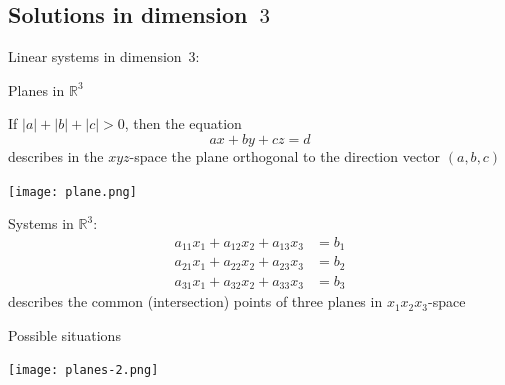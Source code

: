 \documentclass%
[handout]%
{beamer}
\newcommand{\bR}{{\mathbb R}}
\begin{document}
\subsection{Solutions in dimension~$3$}

\begin{frame}[label=dim3]{Linear systems in dimension~$3$:}
\vspace*{-7pt}
  \begin{block}{Planes in $\bR^3$}
  \begin{minipage}[b]{6cm}
  If $|a|+|b|+|c|>0$, then the equation
  \[
      ax+ by + cz = d
  \]
  describes in the $xyz$-space the plane orthogonal to the direction vector $(a,b,c)$
  \end{minipage} \qquad
    \texttt{[image: plane.png]}
  \end{block}

  \vspace*{-5pt}

  \begin{block}{Systems in $\bR^3$:}
  \[
    \begin{matrix}
      a_{11}x_1 + a_{12}x_2 + a_{13}x_3 &=b_1\\
      a_{21}x_1 + a_{22}x_2 + a_{23}x_3 &=b_2\\
      a_{31}x_1 + a_{32}x_2 + a_{33}x_3 &=b_3
    \end{matrix}
  \]
  describes the common (intersection) points of three planes in $x_1x_2x_3$-space
  \end{block}
\end{frame}

\begin{frame}[label=possibilities3]{Possible situations}

\vspace*{-10pt}

\begin{center}\texttt{[image: planes-2.png]}
\end{center}

\end{frame}

\end{document}
